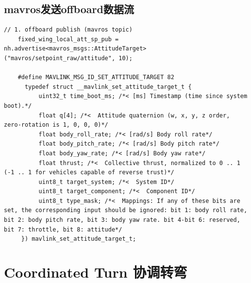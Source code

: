 

\subsection{mavros发送offboard数据流}
\begin{lstlisting}[title=publish messgae, frame=shadowbox]
    // 1. offboard publish (mavros topic)
    fixed_wing_local_att_sp_pub = nh.advertise<mavros_msgs::AttitudeTarget>("mavros/setpoint_raw/attitude", 10);
    
    #define MAVLINK_MSG_ID_SET_ATTITUDE_TARGET 82
      typedef struct __mavlink_set_attitude_target_t {
          uint32_t time_boot_ms; /*< [ms] Timestamp (time since system boot).*/
          float q[4]; /*<  Attitude quaternion (w, x, y, z order, zero-rotation is 1, 0, 0, 0)*/
          float body_roll_rate; /*< [rad/s] Body roll rate*/
          float body_pitch_rate; /*< [rad/s] Body pitch rate*/
          float body_yaw_rate; /*< [rad/s] Body yaw rate*/
          float thrust; /*<  Collective thrust, normalized to 0 .. 1 (-1 .. 1 for vehicles capable of reverse trust)*/
          uint8_t target_system; /*<  System ID*/
          uint8_t target_component; /*<  Component ID*/
          uint8_t type_mask; /*<  Mappings: If any of these bits are set, the corresponding input should be ignored: bit 1: body roll rate, bit 2: body pitch rate, bit 3: body yaw rate. bit 4-bit 6: reserved, bit 7: throttle, bit 8: attitude*/
     }) mavlink_set_attitude_target_t;
\end{lstlisting}
\section{Coordinated Turn 协调转弯}
